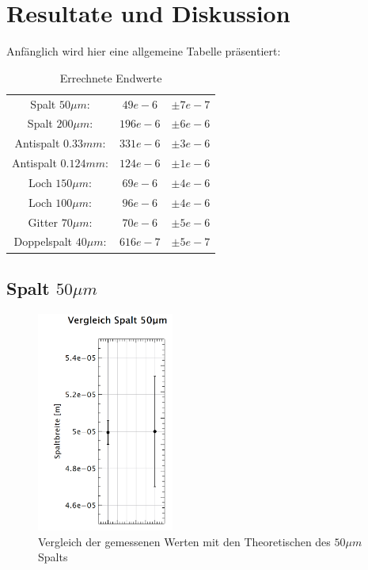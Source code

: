 \section{Resultate und Diskussion}\label{sec:diskussion}
Anfänglich wird hier eine allgemeine Tabelle präsentiert:

\begin{table}[H]
	\centering
	\begin{tabular}{ccc}
		Spalt $50\mu m$:		&  $49e-6$  	&  $\pm7e-7$\\
		Spalt $200\mu m$:		&  $196e-6$		&  $\pm6e-6$\\
		Antispalt $0.33mm$: 	&  $331e-6$		&  $\pm3e-6$\\
		Antispalt $0.124mm$:	&  $124e-6$		&  $\pm1e-6$\\
		Loch $150\mu m$: 		&  $69e-6$		&  $\pm4e-6$\\
		Loch $100\mu m$: 		&  $96e-6$		&  $\pm4e-6$\\
		Gitter $70\mu m$:  		&  $70e-6$		&  $\pm5e-6$\\
		Doppelspalt $40\mu m$: 	&  $616e-7$		&  $\pm5e-7$\\
	\end{tabular}
	\caption{Errechnete Endwerte}
	\label{tab:final}
\end{table}

\subsection*{Spalt $50\mu m$}
\begin{figure}[h!]
	\centering
	\includegraphics[width=0.4\textwidth]{data/dis_sp_50.png}
	\caption{Vergleich der gemessenen Werten mit den Theoretischen des $50\mu m$ Spalts}
	\label{fig:dis_spalt_50}
\end{figure}


